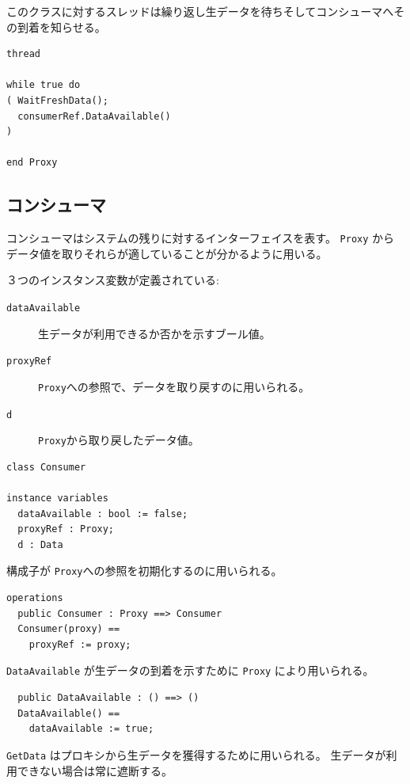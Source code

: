 \documentclass[\pformat,12pt]{jreport}
\begin{document}
このクラスに対するスレッドは繰り返し生データを待ちそしてコンシューマへその到着を知らせる。

\begin{lstlisting}
thread

while true do
( WaitFreshData();
  consumerRef.DataAvailable()
)

end Proxy
\end{lstlisting}

\subsection{コンシューマ}

コンシューマはシステムの残りに対するインターフェイスを表す。
 \texttt{Proxy} からデータ値を取りそれらが適していることが分かるように用いる。

３つのインスタンス変数が定義されている:

\begin{description}
\item[\texttt{dataAvailable}] 生データが利用できるか否かを示すブール値。
\item[\texttt{proxyRef}]  \texttt{Proxy}への参照で、データを取り戻すのに用いられる。
\item[\texttt{d}]  \texttt{Proxy}から取り戻したデータ値。
\end{description}

\begin{lstlisting}
class Consumer

instance variables
  dataAvailable : bool := false;
  proxyRef : Proxy;
  d : Data
\end{lstlisting}

構成子が \texttt{Proxy}への参照を初期化するのに用いられる。

\begin{lstlisting}
operations
  public Consumer : Proxy ==> Consumer
  Consumer(proxy) ==
    proxyRef := proxy;
\end{lstlisting}

\texttt{DataAvailable} が生データの到着を示すために \texttt{Proxy} により用いられる。

\begin{lstlisting}
  public DataAvailable : () ==> ()
  DataAvailable() ==
    dataAvailable := true;
\end{lstlisting}

\texttt{GetData} はプロキシから生データを獲得するために用いられる。
生データが利用できない場合は常に遮断する。
\end{document}
